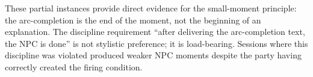 These partial instances provide direct evidence for the small-moment principle:
the arc-completion is the end of the moment, not the beginning of an explanation.
The discipline requirement ``after delivering the arc-completion text, the NPC
is done'' is not stylistic preference; it is load-bearing. Sessions where this
discipline was violated produced weaker NPC moments despite the party having
correctly created the firing condition.
